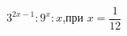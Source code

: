 \begin{ex}[type=calculate_expression]
	\begin{condition}
		\( 3^{2x-1}:9^x:x \),\quad при \( x=\dfrac{1}{12} \)
	\end{condition}
\end{ex}